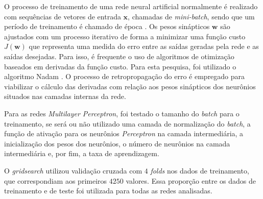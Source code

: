 \documentclass{article}
\begin{document}
O processo de treinamento de uma rede neural artificial normalmente é realizado com sequências de vetores de entrada $\mathbf{x}$, chamadas de \textit{mini-batch}, sendo que um período de treinamento é chamado de época \cite{geron2019hands}. Os pesos sinápticos $\textbf{w}$ são ajustados com um processo iterativo de forma a minimizar uma função custo $J(\textbf{w})$ que representa uma medida do erro entre as saídas geradas pela rede e as saídas desejadas. Para isso, é frequente o uso de algoritmos de otimização baseados em derivadas da função custo. Para esta pesquisa, foi utilizado o algoritmo Nadam \cite{dozat2016incorporating}. O processo de retropropagação do erro é empregado para viabilizar o cálculo das derivadas com relação aos pesos sinápticos dos neurônios situados nas camadas internas da rede.

Para as redes \textit{Multilayer Perceptron}, foi testado o tamanho do \textit{batch} para o treinamento, se será ou não utilizado uma camada de normalização do \textit{batch}, a função de ativação para os neurônios \textit{Perceptron} na camada intermediária, a inicialização dos pesos dos neurônios, o número de neurônios na camada intermediária e, por fim, a taxa de aprendizagem. 

O \textit{gridsearch} utilizou validação cruzada com $4$ \textit{folds} nos dados de treinamento, que correspondiam aos primeiros $4250$ valores. Essa proporção entre os dados de treinamento e de teste foi utilizada para todas as redes analisadas.
\end{document}
